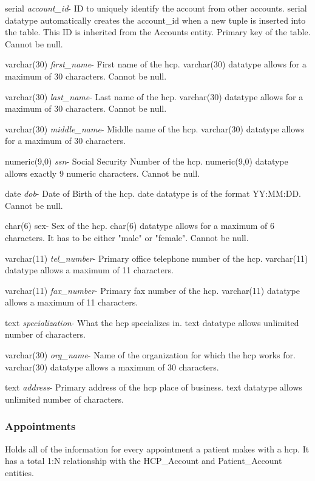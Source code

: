\documentclass[10pt]{report}
\begin{document}
\begin{description}
\item serial \textit{account\_id}- ID to uniquely identify the account from other accounts. serial datatype automatically creates the account\_id when a new tuple is inserted into the table.  This ID is inherited from the Accounts entity. Primary key of the table.  Cannot be null.
\item varchar(30) \textit{first\_name}-  First name of the hcp.  varchar(30) datatype allows for a maximum of 30 characters.  Cannot be null.
\item varchar(30) \textit{last\_name}- Last name of the hcp.  varchar(30) datatype allows for a maximum of 30 characters.  Cannot be null.
\item varchar(30) \textit{middle\_name}- Middle name of the hcp. varchar(30) datatype allows for a maximum of 30 characters.
\item numeric(9,0) \textit{ssn}- Social Security Number of the hcp. numeric(9,0) datatype allows exactly 9 numeric characters.  Cannot be null.
\item date \textit{dob}- Date of Birth of the hcp.  date datatype is of the format YY:MM:DD.  Cannot be null.
\item char(6) sex- Sex of the hcp. char(6) datatype allows for a maximum of 6 characters.  It has to be either "male" or "female".  Cannot be null.
\item varchar(11) \textit{tel\_number}- Primary office telephone number of the hcp.  varchar(11) datatype allows a maximum of 11 characters.
\item varchar(11) \textit{fax\_number}- Primary fax number of the hcp.  varchar(11) datatype allows a maximum of 11 characters.
\item text \textit{specialization}- What the hcp specializes in.  text datatype allows unlimited number of characters.
\item varchar(30) \textit{org\_name}- Name of the organization for which the hcp works for.  varchar(30) datatype allows a maximum of 30 characters.
\item text \textit{address}- Primary address of the hcp place of business.  text datatype allows unlimited number of characters.
\end{description}

\subsubsection{Appointments}
Holds all of the information for every appointment a patient makes with a hcp.  It has a total 1:N relationship with the HCP\_Account and Patient\_Account entities.
\end{document}
